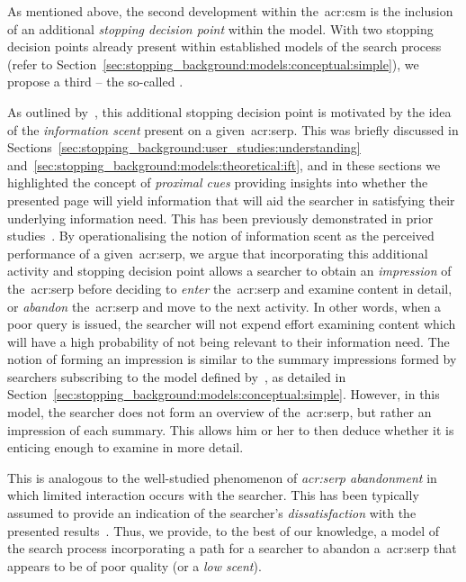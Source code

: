 \noindent
{} As mentioned above, the second development within the~\gls{acr:csm} is the inclusion of an additional \emph{stopping decision point} within the model. With two stopping decision points already present within established models of the search process (refer to Section~\ref{sec:stopping_background:models:conceptual:simple}), we propose a third -- the so-called .

As outlined by~\cite{maxwell2018serp}, this additional stopping decision point is motivated by the idea of the \emph{information scent} present on a given~\gls{acr:serp}. This was briefly discussed in Sections~\ref{sec:stopping_background:user_studies:understanding} and~\ref{sec:stopping_background:models:theoretical:ift}, and in these sections we highlighted the concept of \emph{proximal cues} providing insights into whether the presented page will yield information that will aid the searcher in satisfying their underlying information need. This has been previously demonstrated in prior studies~\citep{wu2014information_scent, ong2017scent_behaviour, maxwell2017snippets}. By operationalising the notion of information scent as the perceived performance of a given~\gls{acr:serp}, we argue that incorporating this additional activity and stopping decision point allows a searcher to obtain an \emph{impression} of the~\gls{acr:serp} before deciding to \emph{enter} the~\gls{acr:serp} and examine content in detail, or \emph{abandon} the~\gls{acr:serp} and move to the next activity. In other words, when a poor query is issued, the searcher will not expend effort examining content which will have a high probability of not being relevant to their information need. The notion of forming an impression is similar to the summary impressions formed by searchers subscribing to the model defined by~\cite{thomas2014modelling_behaviour}, as detailed in Section~\ref{sec:stopping_background:models:conceptual:simple}. However, in this model, the searcher does not form an overview of the~\gls{acr:serp}, but rather an impression of each summary. This allows him or her to then deduce whether it is enticing enough to examine in more detail.

This is analogous to the well-studied phenomenon of \emph{\gls{acr:serp} abandonment} in which limited interaction occurs with the searcher. This has been typically assumed to provide an indication of the searcher's \emph{dissatisfaction} with the presented results~\citep{dassarma2008serp_abandonment, chuklin2012serp_abandonment}. Thus, we provide, to the best of our knowledge, a model of the search process incorporating a path for a searcher to abandon a~\gls{acr:serp} that appears to be of poor quality (or a \emph{low scent}).

